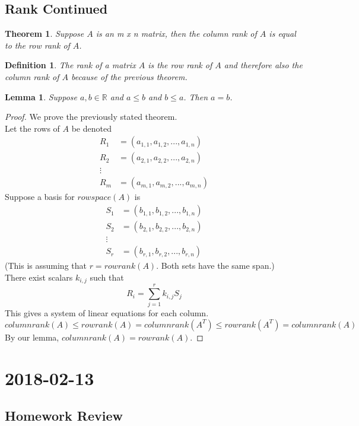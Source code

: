 \documentclass{report}
\newtheorem*{defn}{Definition}
\newtheorem*{thrm}{Theorem}
\newtheorem*{lemma}{Lemma}
\newcommand{\mychapter}[2]{
	\setcounter{chapter}{#1}
	\setcounter{section}{0}
	\chapter*{#2}
	\addcontentsline{toc}{chapter}{#2}
}
\begin{document}
\section{Rank Continued}
\begin{thrm}
Suppose $A$ is an m x n matrix, then the column rank of $A$ is equal to the row rank of $A$.
\end{thrm}
\begin{defn}
The rank of a matrix $A$ is the row rank of $A$ and therefore also the column rank of $A$ because of the previous theorem.
\end{defn}
\begin{lemma}
Suppose $a,b\in \mathbb{R}$ and $a\leq b$ and $b\leq a$. Then $a=b$.
\end{lemma}
\begin{proof}
We prove the previously stated theorem.\\
Let the rows of $A$ be denoted
\begin{align*}
R_1 &= (a_{1,1},a_{1,2}, ..., a_{1,n})\\
R_2 &= (a_{2,1},a_{2,2}, ..., a_{2,n})\\
\vdots\\
R_m &= (a_{m,1},a_{m,2}, ..., a_{m,n})
\end{align*}
Suppose a basis for $rowspace(A)$ is
\begin{align*}
S_1 &= (b_{1,1},b_{1,2}, ..., b_{1,n})\\
S_2 &= (b_{2,1},b_{2,2}, ..., b_{2,n})\\
\vdots\\
S_r &= (b_{r,1},b_{r,2}, ..., b_{r,n})
\end{align*}
(This is assuming that $r=rowrank(A)$. Both sets have the same span.)\\
There exist scalars $k_{i,j}$ such that
\[ R_i = \sum_{j=1}^rk_{i,j}S_j \]
This gives a system of linear equations for each column.
\[ columnrank(A) \leq rowrank(A) = columnrank(A^T) \leq rowrank(A^T) = columnrank(A) \]
By our lemma, $columnrank(A) = rowrank(A)$.
\end{proof}

\mychapter{15}{2018-02-13}
\section{Homework Review}
\end{document}

